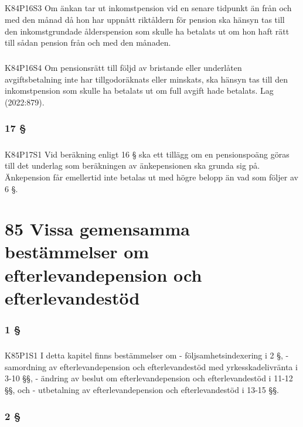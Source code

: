 \documentclass[a4paper,notitlepage,openany,10pt]{book}
\begin{document}
\paragraph*{}
{\tiny K84P16S3}
Om änkan tar ut inkomstpension vid en senare tidpunkt än från och med den månad då hon har uppnått riktåldern för pension ska hänsyn tas till den inkomstgrundade ålderspension som skulle ha betalats ut om hon haft rätt till sådan pension från och med den månaden.
\paragraph*{}
{\tiny K84P16S4}
Om pensionsrätt till följd av bristande eller underlåten avgiftsbetalning inte har tillgodoräknats eller minskats, ska hänsyn tas till den inkomstpension som skulle ha betalats ut om full avgift hade betalats.
Lag (2022:879).
\subsection*{17 §}
\paragraph*{}
{\tiny K84P17S1}
Vid beräkning enligt 16 § ska ett tillägg om en pensionspoäng göras till det underlag som beräkningen av änkepensionen ska grunda sig på. Änkepension får emellertid inte betalas ut med högre belopp än vad som följer av 6 §.
\chapter*{85 Vissa gemensamma bestämmelser om efterlevandepension och efterlevandestöd}
\subsection*{1 §}
\paragraph*{}
{\tiny K85P1S1}
I detta kapitel finns bestämmelser om
\newline - följsamhetsindexering i 2 §,
\newline - samordning av efterlevandepension och efterlevandestöd med yrkesskadelivränta i 3-10 §§,
\newline - ändring av beslut om efterlevandepension och efterlevandestöd i 11-12 §§, och
\newline - utbetalning av efterlevandepension och efterlevandestöd i 13-15 §§.
\subsection*{2 §}
\end{document}
